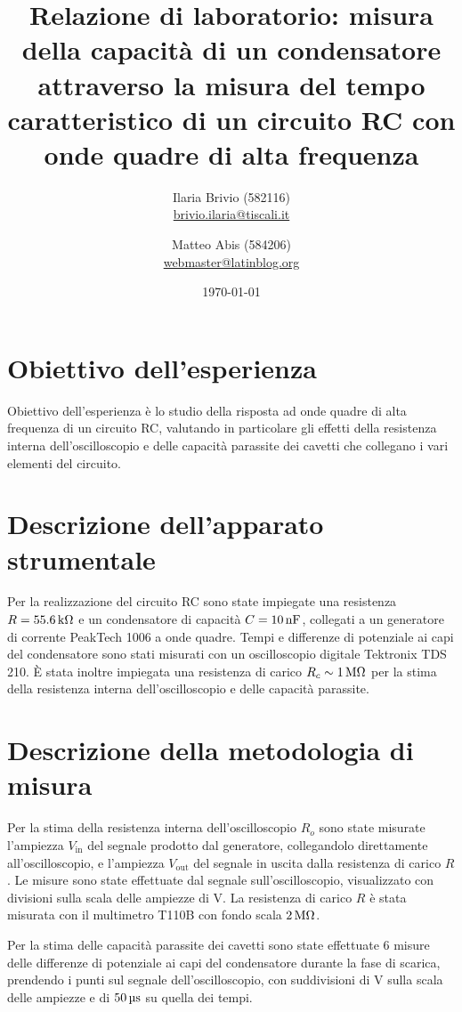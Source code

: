 \documentclass[italian,a4paper]{article}
\begin{document}
\title{Relazione di laboratorio: misura della capacità di un condensatore attraverso la misura del tempo caratteristico di un circuito RC con onde quadre di alta frequenza}
\author{\normalsize Ilaria Brivio (582116)\\%
\normalsize \url{brivio.ilaria@tiscali.it}%
\and %
\normalsize Matteo Abis (584206)\\ %
\normalsize \url{webmaster@latinblog.org}}
\date{\today}
\maketitle
\section{Obiettivo dell'esperienza}
Obiettivo dell'esperienza è lo studio della risposta ad onde quadre di alta frequenza di un circuito RC, valutando in particolare gli effetti della resistenza interna dell'oscilloscopio e delle capacità parassite dei cavetti che collegano i vari elementi del circuito.
\section{Descrizione dell'apparato strumentale}
Per la realizzazione del circuito RC sono state impiegate una resistenza $R=\unit[55.6]{k\ohm}$ e un condensatore di capacità $C=\unit[10]{nF}$, collegati a un generatore di corrente PeakTech 1006 a onde quadre. 
Tempi e differenze di potenziale ai capi del condensatore sono stati misurati con un oscilloscopio digitale Tektronix TDS 210. \`{E} stata inoltre impiegata una resistenza di carico $R_c\sim\unit[1]{M\ohm}$ per la stima della resistenza interna dell'oscilloscopio e delle capacità parassite.
\section{Descrizione della metodologia di misura}
Per la stima della resistenza interna dell'oscilloscopio $R_o$ sono state misurate l'ampiezza $V_{\text{in}}$ del segnale prodotto dal generatore, collegandolo direttamente all'oscilloscopio, e l'ampiezza $V_{\text{out}}$ del segnale in uscita dalla resistenza di carico $R$. Le misure sono state effettuate dal segnale sull'oscilloscopio, visualizzato con divisioni sulla scala delle ampiezze di \unit[5]{V}.
La resistenza di carico $R$ è stata misurata con il multimetro T110B con fondo scala $\unit[2]{M\ohm}$.

Per la stima delle capacità parassite dei cavetti sono state effettuate 6 misure delle differenze di potenziale ai capi del condensatore durante la fase di scarica, prendendo i punti sul segnale dell'oscilloscopio, con suddivisioni di \unit[2]{V} sulla scala delle ampiezze e di $\unit[50]{\micro s}$ su quella dei tempi.
\end{document}
